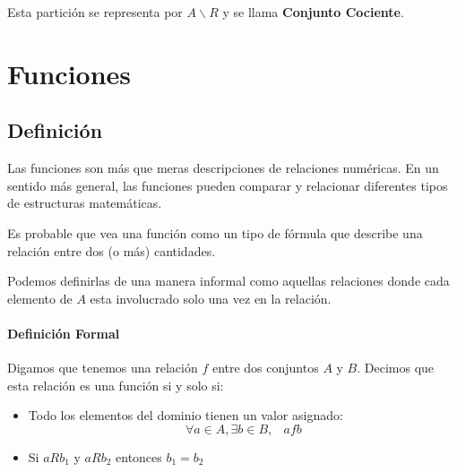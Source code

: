 \documentclass[12pt]{report}                                    %
\DeclareMathOperator \Space {\quad}                             %
\DeclareMathOperator \MiniSpace {\;}                            %
\begin{document}
            Esta partición se representa por $A \backslash R$ y se llama
            \textbf{Conjunto Cociente}.






\chapter{Funciones}
    \clearpage    



    \section{Definición}

        Las funciones son más que meras descripciones de relaciones numéricas. En un sentido más general,
        las funciones pueden comparar y relacionar diferentes tipos de estructuras matemáticas.

        Es probable que vea una función como un tipo de fórmula que describe una relación entre dos
        (o más) cantidades.

        Podemos definirlas de una manera informal como aquellas relaciones donde cada elemento de $A$ 
        esta involucrado solo una vez en la relación.

        \subsubsection*{Definición Formal}

        Digamos que tenemos una relación $f$ entre dos conjuntos $A$ y $B$.
        Decimos que esta relación es una función si y solo si:

        \begin{itemize}
            \item Todo los elementos del dominio tienen un valor asignado:
                \begin{equation}
                    \forall a \in A, \exists b \in B, \MiniSpace afb
                \end{equation}

            \item Si $aRb_1$ y $aRb_2$ entonces $b_1 = b_2$

        \end{itemize}
\end{document}
